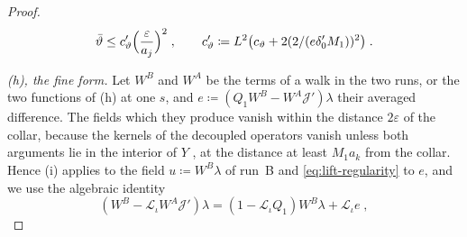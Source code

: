 \documentclass[11pt]{preprint}
\numberwithin{equation}{section}
\theoremstyle{definition}
\theoremstyle{remark}
\theoremstyle{plain}
\begin{document}
\begin{proof}
\begin{equation}\label{eq:background-size-layer}
    \bar\vartheta \leq c'_\vartheta\Bigl(\frac{\varepsilon}{a_j}\Bigr)^2\;,
    \qquad
    c'_\vartheta \coloneqq L^2\bigl(c_\vartheta + 2(2/(e\delta'_0M_1))^2\bigr)\;.
\end{equation}

\emph{(h), the fine form.} Let $W^B$ and $W^A$ be the terms of a walk in the two runs, or the two functions of (h) at one $s$, and $e \coloneqq (Q_1W^B - W^A\mathcal J')\lambda$ their averaged difference. The fields which they produce vanish within the distance $2\varepsilon$ of the collar, because the kernels of the decoupled operators vanish unless both arguments lie in the interior of $Y$ \cite[p.~4]{BalabanRG2}, at the distance at least $M_1a_k$ from the collar. Hence (i) applies to the field $u \coloneqq W^B\lambda$ of run~B and \eqref{eq:lift-regularity} to $e$, and we use the algebraic identity
\begin{equation}\label{eq:fine-from-averaged}
    (W^B - \mathcal L_\iota W^A\mathcal J')\lambda = (1 - \mathcal L_\iota Q_1)W^B\lambda + \mathcal L_\iota e\;,
\end{equation}

\end{proof}
\end{document}
